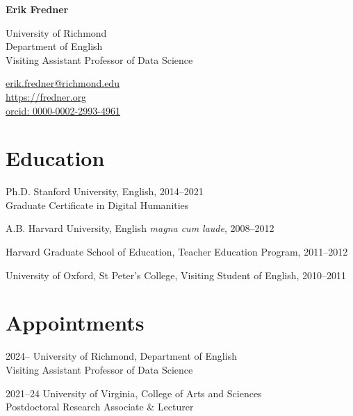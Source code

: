 \documentclass[12pt,letterpaper]{report}
\newcommand{\myname}{Erik Fredner}
\newcommand{\namefont}[1]{{\normalfont\bfseries\Huge{#1}}}
\begin{document}
\raggedright{}

\namefont{\myname}

\vspace{1em}
\begin{minipage}[t]{0.700\textwidth}
	University of Richmond\\
	Department of English\\
	Visiting Assistant Professor of Data Science
\end{minipage}
\begin{minipage}[t]{0.295\textwidth}
	\flushright{}
	\href{mailto:erik.fredner@richmond.edu}{erik.fredner@richmond.edu} \\
	\href{https://fredner.org}{https://fredner.org} \\
	\href{https://orcid.org/0000-0002-2993-4961}{orcid: 0000-0002-2993-4961}
\end{minipage}

\section*{Education}

\begin{tablist}
	\item[Ph.D.] \tab{}Stanford University, English, 2014--2021 \\
	Graduate Certificate in Digital Humanities
	\item[A.B.]  \tab{}Harvard University, English \textit{magna cum laude}, 2008--2012
	\item[] \tab{}Harvard Graduate School of Education, Teacher Education Program, 2011--2012
	\item[] \tab{}University of Oxford, St Peter's College, Visiting Student of English, 2010--2011
\end{tablist}

\section*{Appointments}

\begin{tablist}
	\item[2024--]   \tab{}University of Richmond, Department of English\\
	Visiting Assistant Professor of Data Science
	\item[2021--24] \tab{}University of Virginia, College of Arts and Sciences\\
	Postdoctoral Research Associate \& Lecturer
\end{tablist}
\end{document}
